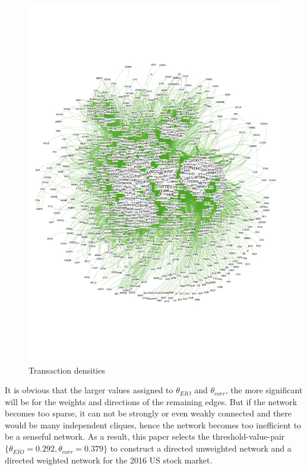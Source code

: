 \begin{figure}
	\begin{center}
		\includegraphics[width=14cm]{Graph_01}
	\end{center}
	\caption{Transaction densities}
	\label{fig:Graph_01}
\end{figure}


It is obvious that the larger values assigned to $\theta_{EIO}$ and $\theta_{corr}$, the more significant will be for the weights and directions of the remaining edges. But if the network becomes too sparse, it can not be strongly or even weakly connected and there would be many independent cliques, hence the network becomes too inefficient to be a senseful network. As a result, this paper selects the threshold-value-pair $\{\theta_{EIO}=0.292, \theta_{corr}=0.379\}$ to construct a directed unweighted network and a directed weighted network for the 2016 US stock market.

